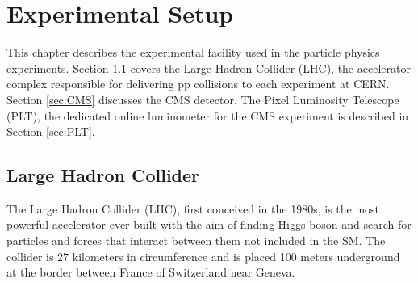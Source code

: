 \chapter{Experimental Setup} \label{ch:expSetup}

This chapter describes the experimental facility used in the particle physics experiments. Section
\ref{sec:LHC} covers the Large Hadron Collider (LHC), the accelerator complex responsible for delivering pp collisions to each experiment at CERN. Section \ref{sec:CMS} discusses the CMS detector. The Pixel Luminosity Telescope (PLT), the dedicated online luminometer for the CMS experiment is described in Section \ref{sec:PLT}.

\section{Large Hadron Collider} \label{sec:LHC}

The Large Hadron Collider (LHC), first conceived in the 1980s, is the most powerful accelerator ever built with the aim of finding Higgs boson and search for particles and forces that interact between them not included in the SM. The collider is 27 kilometers in circumference and is placed 100 meters underground at the border between France of Switzerland near Geneva.




